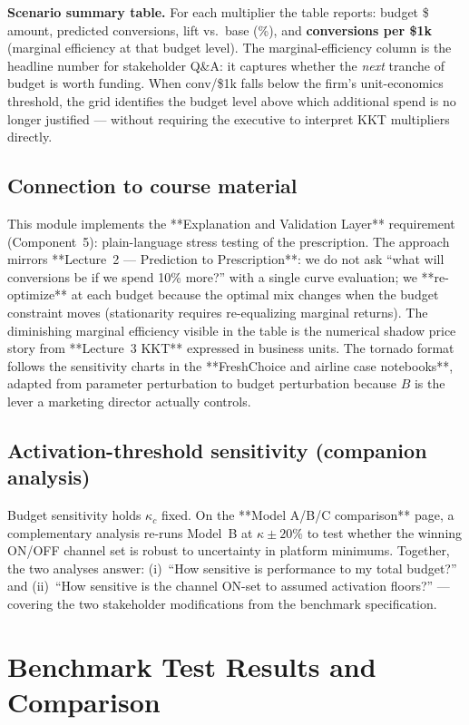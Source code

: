 \documentclass[11pt]{article}
\begin{document}
\textbf{Scenario summary table.} For each multiplier the table reports: budget \$ amount, predicted conversions, lift vs.\ base (\%), and \textbf{conversions per \$1k} (marginal efficiency at that budget level). The marginal-efficiency column is the headline number for stakeholder Q\&A: it captures whether the \emph{next} tranche of budget is worth funding. When conv/\$1k falls below the firm's unit-economics threshold, the grid identifies the budget level above which additional spend is no longer justified --- without requiring the executive to interpret KKT multipliers directly.

\subsection{Connection to course material}

This module implements the **Explanation and Validation Layer** requirement (Component~5): plain-language stress testing of the prescription. The approach mirrors **Lecture~2 --- Prediction to Prescription**: we do not ask ``what will conversions be if we spend 10\% more?'' with a single curve evaluation; we **re-optimize** at each budget because the optimal mix changes when the budget constraint moves (stationarity requires re-equalizing marginal returns). The diminishing marginal efficiency visible in the table is the numerical shadow price story from **Lecture~3 KKT** expressed in business units. The tornado format follows the sensitivity charts in the **FreshChoice and airline case notebooks**, adapted from parameter perturbation to budget perturbation because $B$ is the lever a marketing director actually controls.

\subsection{Activation-threshold sensitivity (companion analysis)}

Budget sensitivity holds $\kappa_c$ fixed. On the **Model A/B/C comparison** page, a complementary analysis re-runs Model~B at $\kappa \pm 20\%$ to test whether the winning ON/OFF channel set is robust to uncertainty in platform minimums. Together, the two analyses answer: (i)~``How sensitive is performance to my total budget?'' and (ii)~``How sensitive is the channel ON-set to assumed activation floors?'' --- covering the two stakeholder modifications from the benchmark specification.

\section{Benchmark Test Results and Comparison}
\end{document}

